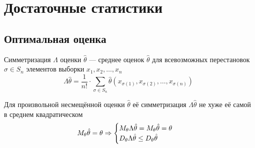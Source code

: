 \chapter{Достаточные статистики}
\section{Оптимальная оценка}
\begin{definition}[Симметризация]
    Симметризация $\Lambda$ оценки $\hat{\theta}$ --- среднее
    оценок $\hat{\theta}$ для
    всевозможных перестановок $\sigma\in S_n$
    элементов выборки $x_1, x_2, \dots, x_n$
    $$\Lambda\hat{\theta}
        =\frac{1}{n!}\cdot\sum_{\sigma\in S_n} \hat{\theta}\left(
            x_{\sigma\left(1\right)}, x_{\sigma\left(2\right)},
                \dots, x_{\sigma\left(n\right)}\right)$$
\end{definition}
\begin{lemma}
    Для произвольной несмещённой оценки $\hat{\theta}$
    её симметризация $\Lambda{\hat{\theta}}$
    не хуже её самой в среднем квадратическом
    \begin{align*}
    M_{\theta} \hat{\theta}
        =\theta
    \Rightarrow
        \begin{cases}
            M_{\theta} \Lambda{\hat{\theta}}
                =M_{\theta} \hat{\theta}
                =\theta\\
            D_{\theta} \Lambda{\hat{\theta}}
                \le D_{\theta} \hat{\theta}
        \end{cases}
    \end{align*}
\end{lemma}
